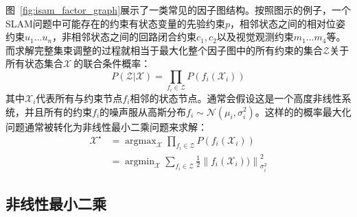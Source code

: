 图~\ref{fig:isam_factor_graph}展示了一类常见的因子图结构。按照图示的例子，一个SLAM问题中可能存在的约束有状态变量的先验约束$p$，相邻状态之间的相对位姿约束$u_1 \dots u_n$，非相邻状态之间的回路闭合约束$c_1,c_2$以及视觉观测约束$m_1 \dots m_4$等。而求解完整集束调整的过程就相当于最大化整个因子图中的所有约束的集合$\mathcal{Z}$关于所有状态集合$\mathcal{X}~$的联合条件概率：
\begin{equation}
    P(\mathcal{Z}|\mathcal{X}) = \prod_{f_i\in\mathcal{Z}} P(f_i(\mathcal{X}_i))
\end{equation}
其中$\mathcal{X}_i$代表所有与约束节点$f_i$相邻的状态节点。通常会假设这是一个高度非线性系统，并且所有的约束$f_i$的噪声服从高斯分布$f_i\sim\mathcal{N}(\mu_i, \sigma_i^2)$。这样的的概率最大化问题通常被转化为非线性最小二乘问题来求解：
\begin{equation}
\begin{aligned}
    \mathcal{X}^\star &= \mathop{\arg\max}_{\mathcal{X}}
                         \prod_{f_i\in\mathcal{Z}} P(f_i(\mathcal{X}_i)) \\
                      &= \mathop{\arg\min}_{\mathcal{X}}
                         \sum_{f_i\in\mathcal{Z}} \tfrac{1}{2}
                         \left\| f_i(\mathcal{X}_i)) \right\|_{\sigma_i^2}^2
\end{aligned}
\end{equation}

\subsection{非线性最小二乘}

